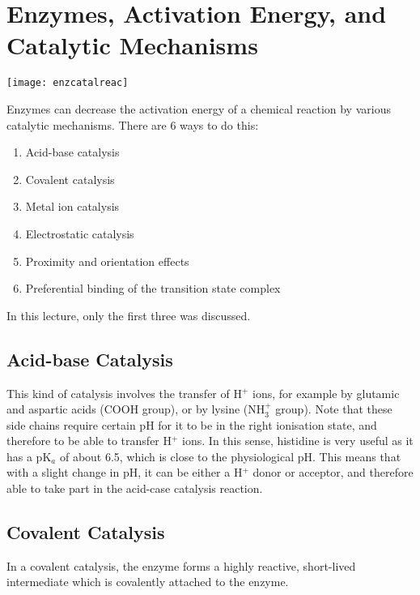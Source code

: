 \section{Enzymes, Activation Energy, and \\Catalytic Mechanisms}

\begin{center}
\texttt{[image: enzcatalreac]}
\end{center}

Enzymes can decrease the activation energy of a chemical reaction by various catalytic mechanisms.
There are 6 ways to do this:

\begin{enumerate}
\item Acid-base catalysis
\item Covalent catalysis
\item Metal ion catalysis
\item Electrostatic catalysis
\item Proximity and orientation effects
\item Preferential binding of the transition state complex
\end{enumerate}

In this lecture, only the first three was discussed.

\subsection{Acid-base Catalysis}

This kind of catalysis involves the transfer of H$^+$ ions, for example by glutamic and aspartic acids (COOH group), or by lysine (NH$_3^+$ group).
Note that these side chains require certain pH for it to be in the right ionisation state, and therefore to be able to transfer H$^+$ ions.
In this sense, histidine is very useful as it has a pK$_a$ of about 6.5, which is close to the physiological pH.
This means that with a slight change in pH, it can be either a H$^+$ donor or acceptor, and therefore able to take part in the acid-case catalysis reaction.

\subsection{Covalent Catalysis}

In a covalent catalysis, the enzyme forms a highly reactive, short-lived intermediate which is covalently attached to the enzyme.


